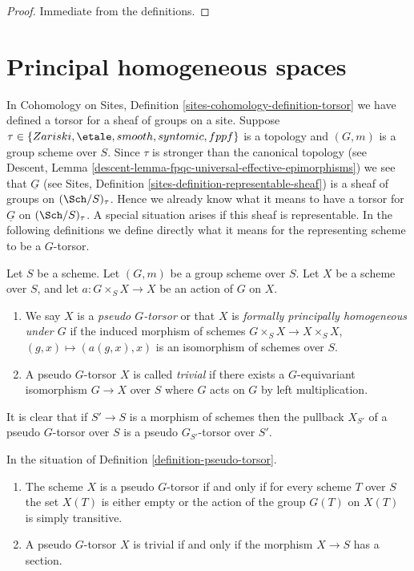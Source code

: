 \begin{proof}
Immediate from the definitions.
\end{proof}






\section{Principal homogeneous spaces}
\label{section-principal-homogeneous}

\noindent
In
Cohomology on Sites, Definition \ref{sites-cohomology-definition-torsor}
we have defined a torsor for a sheaf of groups on a site.
Suppose $\tau \in \{Zariski, \etale, smooth, syntomic, fppf\}$ is a
topology and $(G, m)$ is a group scheme over $S$. Since $\tau$ is stronger than
the canonical topology (see
Descent, Lemma \ref{descent-lemma-fpqc-universal-effective-epimorphisms})
we see that $\underline{G}$ (see
Sites, Definition \ref{sites-definition-representable-sheaf})
is a sheaf of groups on $(\Sch/S)_\tau$.
Hence we already know what it means to have a
torsor for $\underline{G}$ on $(\Sch/S)_\tau$. A special situation
arises if this sheaf is representable. In the following definitions
we define directly what it means for the representing scheme to be a
$G$-torsor.

\begin{definition}
\label{definition-pseudo-torsor}
Let $S$ be a scheme.
Let $(G, m)$ be a group scheme over $S$.
Let $X$ be a scheme over $S$, and let
$a : G \times_S X \to X$ be an action of $G$ on $X$.
\begin{enumerate}
\item We say $X$ is a {\it pseudo $G$-torsor} or that $X$ is
{\it formally principally homogeneous under $G$} if the induced
morphism of schemes $G \times_S X \to X \times_S X$,
$(g, x) \mapsto (a(g, x), x)$ is an isomorphism of schemes over $S$.
\item A pseudo $G$-torsor $X$ is called {\it trivial} if there exists
a $G$-equivariant isomorphism $G \to X$ over $S$ where $G$ acts on
$G$ by left multiplication.
\end{enumerate}
\end{definition}

\noindent
It is clear that if $S' \to S$ is a morphism of schemes then
the pullback $X_{S'}$ of a pseudo $G$-torsor over $S$ is a
pseudo $G_{S'}$-torsor over $S'$.

\begin{lemma}
\label{lemma-characterize-trivial-pseudo-torsors}
In the situation of
Definition \ref{definition-pseudo-torsor}.
\begin{enumerate}
\item The scheme $X$ is a pseudo $G$-torsor if and only if for every scheme
$T$ over $S$ the set $X(T)$ is either empty or the action of the group $G(T)$
on $X(T)$ is simply transitive.
\item A pseudo $G$-torsor $X$ is trivial if and only if the morphism
$X \to S$ has a section.
\end{enumerate}
\end{lemma}

